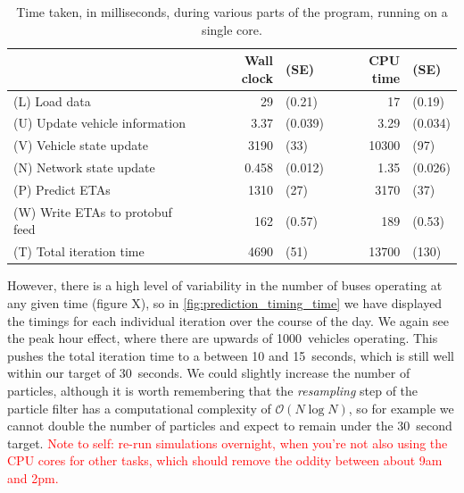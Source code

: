 \begin{knitrout}\small
{}\color{fgcolor}\begin{table}

\caption{\label{tab:prediction_timing}Time taken, in milliseconds, during various parts of the program, running on a single core.}
\centering
\fontsize{8}{10}\selectfont
\begin{tabular}[t]{lrlrl}
\toprule
 & Wall clock & (SE) & CPU time & (SE)\\
\midrule
(L) Load data & 29 & (0.21) & 17 & (0.19)\\
(U) Update vehicle information & 3.37 & (0.039) & 3.29 & (0.034)\\
(V) Vehicle state update & 3190 & (33) & 10300 & (97)\\
(N) Network state update & 0.458 & (0.012) & 1.35 & (0.026)\\
(P) Predict ETAs & 1310 & (27) & 3170 & (37)\\
\addlinespace
(W) Write ETAs to protobuf feed & 162 & (0.57) & 189 & (0.53)\\
\midrule
(T) Total iteration time & 4690 & (51) & 13700 & (130)\\
\bottomrule
\end{tabular}
\end{table}


\end{knitrout}


However, there is a high level of variability in the number of buses operating at any given time (figure X), so in \cref{fig:prediction_timing_time} we have displayed the timings for each individual iteration over the course of the day. We again see the peak hour effect, where there are upwards of 1000~vehicles operating. This pushes the total iteration time to a between 10 and 15~seconds, which is still well within our target of 30~seconds. We could slightly increase the number of particles, although it is worth remembering that the \emph{resampling} step of the particle filter has a computational complexity of $\mathcal{O}(N\log N)$, so for example we cannot double the number of particles and expect to remain under the 30~second target.
\textcolor{red}{Note to self: re-run simulations overnight, when you're not also using the CPU cores for other tasks, which should remove the oddity between about 9am and 2pm.}


